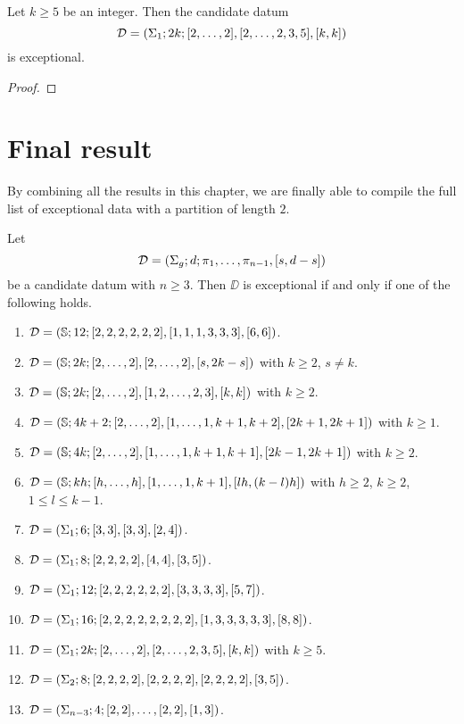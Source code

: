\begin{proposition}\label{short-partition:th:exceptional-torus}
Let $k\ge 5$ be an integer. Then the candidate datum
\[
\mathcal{D}=(\Sigma_{1};2k;[2,\ldots,2],[2,\ldots,2,3,5],[k,k])
\]
is exceptional.
\end{proposition}
\begin{proof}

\end{proof}


\section{Final result}

By combining all the results in this chapter, we are finally able to compile the full list of exceptional data with a partition of length $2$.

\begin{solution-hurwitz*}
Let
\[
\mathcal{D}=(\Sigma_{g};d;\pi_1,\ldots,\pi_{n-1},[s,d-s])
\]
be a candidate datum with $n\ge 3$. Then $\DD$ is exceptional if and only if one of the following holds.
\begin{enumerate}[(1)]
\item $\mathcal{D}=(\mathbb{S}{};12;[2,2,2,2,2,2],[1,1,1,3,3,3],[6,6])$.
\item $\mathcal{D}=(\mathbb{S}{};2k;[2,\ldots,2],[2,\ldots,2],[s,2k-s])$ with $k\ge 2$, $s\neq k$.
\item $\mathcal{D}=(\mathbb{S}{};2k;[2,\ldots,2],[1,2,\ldots,2,3],[k,k])$ with $k\ge2$.
\item $\mathcal{D}=(\mathbb{S}{};4k+2;[2,\ldots,2],[1,\ldots,1,k+1,k+2],[2k+1,2k+1])$ with $k\ge 1$.
\item $\mathcal{D}=(\mathbb{S}{};4k;[2,\ldots,2],[1,\ldots,1,k+1,k+1],[2k-1,2k+1])$ with $k\ge2$.
\item $\mathcal{D}=(\mathbb{S}{};kh;[h,\ldots,h],[1,\ldots,1,k+1],[lh,(k-l)h])$ with $h\ge 2$, $k\ge 2$, $1\le l\le k-1$.
\item $\mathcal{D}=(\Sigma_{1};6;[3,3],[3,3],[2,4])$.
\item $\mathcal{D}=(\Sigma_{1};8;[2,2,2,2],[4,4],[3,5])$.
\item $\mathcal{D}=(\Sigma_{1};12;[2,2,2,2,2,2],[3,3,3,3],[5,7])$.
\item $\mathcal{D}=(\Sigma_{1};16;[2,2,2,2,2,2,2,2],[1,3,3,3,3,3],[8,8])$.
\item $\mathcal{D}=(\Sigma_{1};2k;[2,\ldots,2],[2,\ldots,2,3,5],[k,k])$ with $k\ge 5$.
\item $\mathcal{D}=(\Sigma_{2};8;[2,2,2,2],[2,2,2,2],[2,2,2,2],[3,5])$.
\item $\mathcal{D}=(\Sigma_{n-3};4;[2,2],\ldots,[2,2],[1,3])$.
\end{enumerate}
\end{solution-hurwitz*}